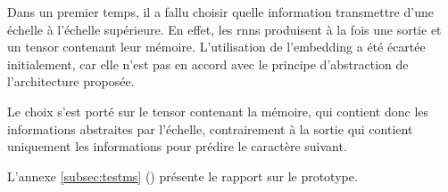 Dans un premier temps, il a fallu choisir quelle information transmettre d'une échelle à l'échelle supérieure. En effet, les \glspl{rnn} produisent à la fois une sortie et un \gls{tensor} contenant leur mémoire. L'utilisation de l'\gls{embedding} a été écartée initialement, car elle n'est pas en accord avec le principe d'abstraction de l'architecture proposée.

Le choix s'est porté sur le \gls{tensor} contenant la mémoire, qui contient donc les informations abstraites par l'échelle, contrairement à la sortie qui  contient uniquement les informations pour prédire le caractère suivant.


L'annexe \ref{subsec:testms} () présente le rapport sur le prototype. 